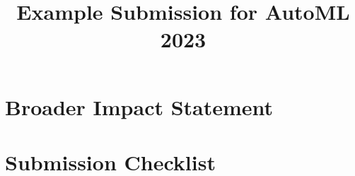 \documentclass[11pt]{article}
\title{Example Submission for AutoML 2023}
\author[1]{\nameemail{Author 1}{email1@example.com}}
\affil[1]{Institution 1}
\begin{document}
\maketitle

\begin{abstract}
\end{abstract}

\section{Broader Impact Statement}

%
%
%
%
%

\section{Submission Checklist}
\end{document}

